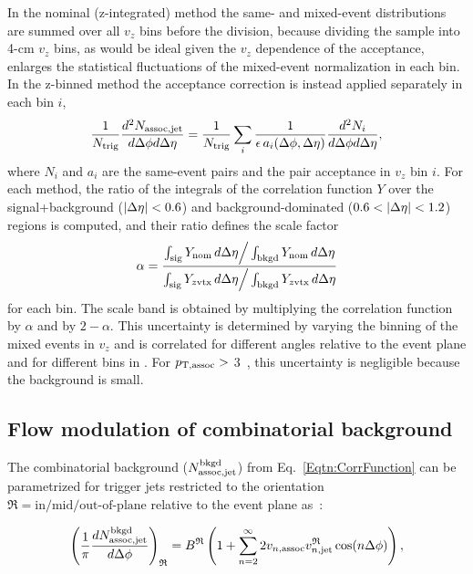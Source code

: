 In the nominal (z-integrated) method the same- and mixed-event distributions are summed over all $v_z$ bins before the division, because dividing the sample into 4-cm $v_z$ bins, as would be ideal given the $v_z$ dependence of the acceptance, enlarges the statistical fluctuations of the mixed-event normalization in each bin.
%
In the z-binned method the acceptance correction is instead applied separately in each bin $i$,
%
\begin{equation}
	\frac{1}{N_{\rm trig}} \frac{d^2N_{\rm assoc,jet}}{d\Delta\phi d\Delta\eta} = \frac{1}{N_{\rm trig}} \sum_i \frac{1}{\epsilon\, a_i(\Delta\phi, \Delta\eta)} \frac{d^2 N_i}{d\Delta\phi d\Delta\eta},
	\label{Eqtn:CorrFunctionZbinned}
\end{equation}
%
where $N_i$ and $a_i$ are the same-event pairs and the pair acceptance in $v_z$ bin $i$.
%
For each method, the ratio of the integrals of the correlation function $Y$ over the signal+background ($|\Delta\eta| < 0.6$) and background-dominated ($0.6 < |\Delta\eta| < 1.2$) regions is computed, and their ratio defines the scale factor
%
\begin{equation}
	\alpha = \frac{\int_\mathrm{sig} Y_\mathrm{nom}\, d\Delta\eta \Big/ \int_\mathrm{bkgd} Y_\mathrm{nom}\, d\Delta\eta}{\int_\mathrm{sig} Y_{z\mathrm{vtx}}\, d\Delta\eta \Big/ \int_\mathrm{bkgd} Y_{z\mathrm{vtx}}\, d\Delta\eta}
	\label{Eqtn:alpha}
\end{equation}
%
for each  bin.
%
The scale band is obtained by multiplying the correlation function by $\alpha$ and by $2 - \alpha$.
%
This uncertainty is determined by varying the binning of the mixed events in $v_z$ and is correlated for different angles relative to the event plane and for different bins in .  For $p_{\mathrm{T, assoc}} >$ 3~\GeVc, this uncertainty is negligible because the background is small.

\subsection{Flow modulation of combinatorial background} \label{sect:CorrBkgd}
The combinatorial background ($N^{\rm bkgd}_{\rm assoc,jet}$) from Eq.~\ref{Eqtn:CorrFunction} can be parametrized for trigger jets restricted to the orientation $\mathfrak{R} = {\text{in/mid/out-of-plane}}$ relative to the event plane as~\cite{Bielcikova:2003ku,Sharma:2015qra}:

\begin{equation}
	\left(\frac{1}{\pi}\frac{dN^{\rm bkgd}_{\rm assoc,jet}}{d\Delta\phi}\right)_\mathfrak{R} = B^\mathfrak{R}\left( 1 + \sum_{n=2}^{\infty} 2 v_{n,\mathrm{assoc}} v^\mathfrak{R}_{n, \mathrm{jet}} \cos(n\Delta\phi)\right)
	\label{Eqtn:JBBBCorrelations},
\end{equation}

